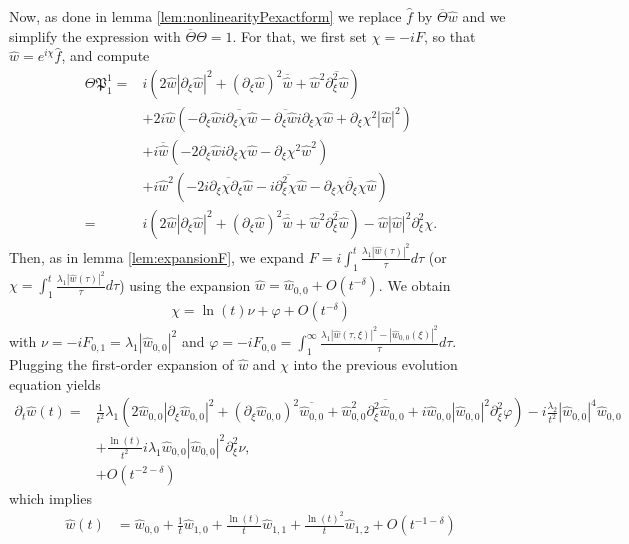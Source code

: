 \documentclass[a4paper, 15pt]{article}
\numberwithin{equation}{section}
\begin{document}
Now, as done in lemma \ref{lem:nonlinearityPexactform} we replace $\hat{f}$ by $\overline{\Theta}\hat{w}$ and we simplify the expression with $\overline{\Theta}\Theta=1$. For that, we first set $\chi=-iF$, so that $\hat{w}=e^{i\chi}\hat{f}$, and compute 
\begin{align*}
\Theta\mathfrak{P}^1_1=&i\left(2\hat{w}|\partial_\xi\hat{w}|^2+(\partial_\xi\hat{w})^2\overline{\hat{w}}+\hat{w}^2\overline{\partial_\xi^2\hat{w}}\right)\\
&+2i\hat{w}\left(-\partial_\xi\hat{w}\overline{i\partial_\xi\chi\hat{w}}-\overline{\partial_\xi\hat{w}}i\partial_\xi\chi\hat{w}+\partial_\xi\chi^2|\hat{w}|^2\right)\\
&+i\overline{\hat{w}}\left(-2\partial_\xi\hat{w}i\partial_\xi\chi\hat{w}-\partial_\xi\chi^2\hat{w}^2\right)\\
&+i\hat{w}^2\left(-2\overline{i\partial_\xi\chi\partial_\xi\hat{w}}-\overline{i\partial^2_\xi\chi\hat{w}}-\overline{\partial_\xi\chi\partial_\xi\chi\hat{w}}\right)\\
=&i\left(2\hat{w}|\partial_\xi\hat{w}|^2+(\partial_\xi\hat{w})^2\overline{\hat{w}}+\hat{w}^2\overline{\partial_\xi^2\hat{w}}\right)-\hat{w}|\hat{w}|^2\partial^2_\xi\chi.
\end{align*}
Then, as in lemma \ref{lem:expansionF}, we expand $F=i\int^t_1\frac{\lambda_1|\hat{w}(\tau)|^2}{\tau}d\tau$ (or $\chi=\int^t_1\frac{\lambda_1|\hat{w}(\tau)|^2}{\tau}d\tau$) using the expansion $\hat{w}=\hat{w}_{0,0}+O(t^{-\delta})$. We obtain 
\begin{align*}
 \chi=\ln(t)\nu+\varphi+O(t^{-\delta})
 \end{align*}
  with $\nu=-iF_{0,1}=\lambda_1|\hat{w}_{0,0}|^2$ and $\varphi=-iF_{0,0}=\int^\infty_1\frac{\lambda_1|\hat{w}(\tau,\xi)|^2-|\hat{w}_{0,0}(\xi)|^2}{\tau}d\tau$. Plugging the first-order expansion of $\hat{w}$ and $\chi$ into the previous evolution equation yields
\begin{align*}
    \partial_t\hat{w}(t)=&\frac{1}{t^2}\lambda_1\left(2\hat{w}_{0,0}|\partial_\xi\hat{w}_{0,0}|^2+(\partial_\xi\hat{w}_{0,0})^2\overline{\hat{w}_{0,0}}+\hat{w}_{0,0}^2\overline{\partial_\xi^2\hat{w}_{0,0}}+i\hat{w}_{0,0}|\hat{w}_{0,0}|^2\partial^2_\xi\varphi\right)-i\frac{\lambda_2}{t^2}|\hat{w}_{0,0}|^4\hat{w}_{0,0}\\
    &+\frac{\ln(t)}{t^2}i\lambda_1\hat{w}_{0,0}|\hat{w}_{0,0}|^2\partial^2_\xi\nu,\\
    &+O(t^{-2-\delta})
\end{align*}
which implies
\begin{align}
    \hat{w}(t)&=\hat{w}_{0,0}+\frac{1}{t}\hat{w}_{1,0}+\frac{\ln(t)}{t}\hat{w}_{1,1}+\frac{\ln(t)^2}{t}\hat{w}_{1,2}+O(t^{-1-\delta})
\end{align}
\end{document}
